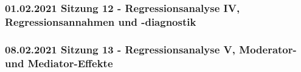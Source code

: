 \documentclass[
]{article}
\begin{document}
\hypertarget{sitzung-12---regressionsanalyse-iv-regressionsannahmen-und--diagnostik}{%
\subsubsection{01.02.2021 Sitzung 12 - Regressionsanalyse IV,
Regressionsannahmen und
-diagnostik}\label{sitzung-12---regressionsanalyse-iv-regressionsannahmen-und--diagnostik}}

\hypertarget{sitzung-13---regressionsanalyse-v-moderator--und-mediator-effekte}{%
\subsubsection{08.02.2021 Sitzung 13 - Regressionsanalyse V, Moderator-
und
Mediator-Effekte}\label{sitzung-13---regressionsanalyse-v-moderator--und-mediator-effekte}}
\end{document}
